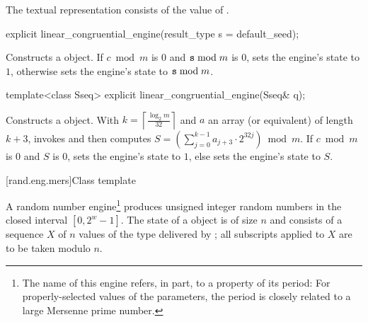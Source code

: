 \pnum The textual representation%
consists of
the value of .

%
\begin{itemdecl}
explicit linear_congruential_engine(result_type s = default_seed);
\end{itemdecl}

\begin{itemdescr}
\pnum\effects Constructs a  object.
 If $ c \bmod m $ is $0$ and $ \texttt{\protect s} \bmod m $ is $0$,
 sets the engine's state to $1$,
 otherwise sets the engine's state to $\texttt{\protect s} \bmod m$.
\end{itemdescr}

%
\begin{itemdecl}
template<class Sseq> explicit linear_congruential_engine(Sseq& q);
\end{itemdecl}

\begin{itemdescr}
\pnum\effects Constructs a  object.
 With
 $ k = \left\lceil \frac{\log_2 m}
                        {32}
            \right\rceil
 $
 and $a$ an array (or equivalent)
 of length $k + 3$,
 invokes 
 and then computes
 $ S = \left(\sum_{j=0}^{k-1}a_{j+3} \cdot 2^{32j} \right) \bmod m $.
 If
   $ c \bmod m $ is $0$
 and
   $S$ is $0$,
 sets the engine's state to $1$,
 else sets the engine's state
 to $S$.
\end{itemdescr}


[rand.eng.mers]{Class template }%
%

\pnum
A  random number
engine\footnote{The name of this engine refers, in part, to a property of its period:
 For properly-selected values of the parameters,
 the period is closely related to a large Mersenne prime number.}
produces unsigned integer random numbers
in the closed interval $[0,2^w-1]$.
The
%
%
state
of a  object 
is of size $n$
and consists of a sequence $X$
of $n$ values of the type delivered by ;
all subscripts applied to $X$ are to be taken modulo $n$.

